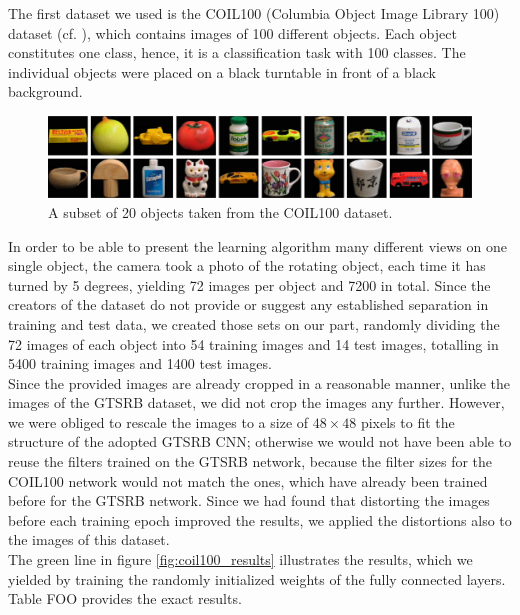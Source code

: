 \documentclass[11pt, a4paper]{article}
\begin{document}
The first dataset we used is the COIL100 (Columbia Object Image Library 100) dataset (cf. \cite{columbia_object_image_library}), which contains images of 100 different objects. Each object constitutes one class, hence, it is a classification task with 100 classes. The individual objects were placed on a black turntable in front of a black background. 
\begin{figure}[h!]
	\centering
	\includegraphics[width=1\textwidth]{coil100}
	\caption{A subset of 20 objects taken from the COIL100 dataset.}
	\label{fig:coil100_objects}
\end{figure}
In order to be able to present the learning algorithm many different views on one single object, the camera took a photo of the rotating object, each time it has turned by 5 degrees, yielding 72 images per object and 7200 in total. Since the creators of the dataset do not provide or suggest any established separation in training and test data, we created those sets on our part, randomly dividing the 72 images of each object into 54 training images and 14 test images, totalling in 5400 training images and 1400 test images.\\
Since the provided images are already cropped in a reasonable manner, unlike the images of the GTSRB dataset, we did not crop the images any further. However, we were obliged to rescale the images to a size of $48 \times 48$ pixels to fit the structure of the adopted GTSRB CNN; otherwise we would not have been able to reuse the filters trained on the GTSRB network, because the filter sizes for the COIL100 network would not match the ones, which have already been trained before for the GTSRB network. Since we had found that distorting the images before each training epoch improved the results, we applied the distortions also to the images of this dataset.\\
The green line in figure \ref{fig:coil100_results} illustrates the results, which we yielded by training the randomly initialized weights of the fully connected layers. Table FOO provides the exact results.
\end{document}
